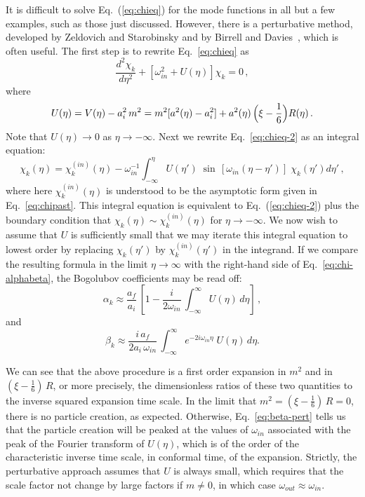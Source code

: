 \documentclass[eqsecnum,floats,aps,prd,floatfix,titlepage,tightenlines]{revtex4}
\begin{document}
 
   It is difficult to solve Eq.~(\ref{eq:chieq}) for the mode 
functions in all but a few examples, such as those just discussed. However, there is a perturbative
method, developed by Zeldovich and Starobinsky \cite{ZS} and by Birrell and
Davies~\cite{BD2}, which is often useful. The first step is to rewrite Eq.~\eqref{eq:chieq}
as
\begin{equation}
{\frac{d^2\chi_k}{d\eta^2}} + [ \omega_{in}^2 + U(\eta) ]\chi_{k} =0 \, ,
                                                 \label{eq:chieq-2}
\end{equation}
where
\begin{equation}
U(\eta) =V(\eta)-a_i^2\, m^2 = m^2[a^2(\eta) -a_i^2] 
        +a^2(\eta)\, \Bigl( \xi - \frac{1}{6}\Bigr) R(\eta)\,.
        \label{eq:U}
\end{equation}
Note that $U(\eta) \rightarrow 0$ as $\eta \rightarrow -\infty$.
Next we rewrite Eq.~\eqref{eq:chieq-2} as an integral equation:
\begin{equation}
\chi_k(\eta) = \chi_k^{(in)}(\eta) - \omega_{in}^{-1} \int_{-\infty}^\eta
             U(\eta')\;\sin \, [\omega_{in}(\eta-\eta')]\;\chi_k(\eta') d\eta' \,,
\end{equation}
where here  $\chi_k^{(in)}(\eta)$ is understood to be the asymptotic form given in Eq.~\eqref{eq:chipast}.
This integral equation is equivalent to Eq.~(\ref{eq:chieq-2}) 
plus the boundary condition that $\chi_k(\eta) \sim \chi_k^{(in)}(\eta)$
for $\eta \rightarrow -\infty$.
We now wish to assume that $U$ is sufficiently small that we
may iterate this integral equation to lowest order by replacing
$\chi_k(\eta')$ by $\chi_k^{(in)}(\eta')$ in the integrand. If we
compare the resulting formula in the limit $\eta \rightarrow \infty$  with 
the right-hand side of Eq.~\eqref{eq:chi-alphabeta},  
the Bogolubov coefficients may be read off:
\begin{equation}
\alpha_k \approx   \frac{a_f}{a_i}\,  \left[1 - \frac{i}{2\omega_{in}} \, \int_{-\infty}^\infty
             U(\eta)\, d\eta \right]\,,
\end{equation}
and
\begin{equation}
\beta_k \approx    \frac{i\, a_f}{2  a_i\, \omega_{in}} \,  \int_{-\infty}^\infty
            e^{-2i\omega_{in} \eta}\; U(\eta)\, d\eta.     \label{eq:beta-pert}
\end{equation}
 
 We can see that the above procedure is a first order expansion in $m^2$ and in
 $( \xi - \frac{1}{6})\, R$, or more precisely, the dimensionless ratios of these two quantities to
 the inverse squared expansion time scale. In the limit that $m^2 = ( \xi - \frac{1}{6})\, R =0$, there is no particle
 creation, as expected. Otherwise, Eq.~\eqref{eq:beta-pert} tells us that the particle creation will be peaked
 at the values of $\omega_{in}$ associated with the peak of the Fourier transform of $U(\eta)$, which is of the 
 order of the characteristic inverse  time scale, in conformal time, of the expansion. Strictly, the perturbative
 approach assumes that $U$ is always small, which requires that the scale factor not change by large factors
 if $m \not=0$, in which case $\omega_{out} \approx \omega_{in}$. 
 
\end{document}
